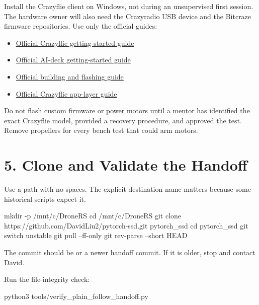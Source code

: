 \documentclass[11pt]{article}
\begin{document}
Install the Crazyflie client on Windows, not during an unsupervised first session. The hardware owner will also need the Crazyradio USB device and the Bitcraze firmware repositories. Use only the official guides:

\begin{itemize}
\item \href{https://www.bitcraze.io/documentation/tutorials/getting-started-with-crazyflie-2-x/}{Official Crazyflie getting-started guide}
\item \href{https://www.bitcraze.io/documentation/tutorials/getting-started-with-aideck/}{Official AI-deck getting-started guide}
\item \href{https://www.bitcraze.io/documentation/repository/crazyflie-firmware/master/building-and-flashing/build/}{Official building and flashing guide}
\item \href{https://www.bitcraze.io/documentation/repository/crazyflie-firmware/master/userguides/app_layer/}{Official Crazyflie app-layer guide}
\end{itemize}

\begin{warnbox}
Do not flash custom firmware or power motors until a mentor has identified the exact Crazyflie model, provided a recovery procedure, and approved the test. Remove propellers for every bench test that could arm motors.
\end{warnbox}

\section{5. Clone and Validate the Handoff}

Use a path with no spaces. The explicit destination name  matters because some historical scripts expect it.

\begin{Code}
mkdir -p /mnt/c/DroneRS
cd /mnt/c/DroneRS
git clone https://github.com/DavidLiu2/pytorch-ssd.git pytorch_ssd
cd pytorch_ssd
git switch unstable
git pull --ff-only
git rev-parse --short HEAD
\end{Code}

The commit should be  or a newer handoff commit. If it is older, stop and contact David.

Run the file-integrity check:

\begin{Code}
python3 tools/verify_plain_follow_handoff.py
\end{Code}
\end{document}
